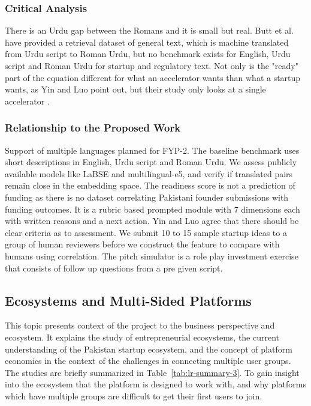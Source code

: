 \documentclass{FastFyp}
\begin{document}
\subsubsection{Critical Analysis}
There is an Urdu gap between the Romans and it is small but real. Butt et al. have provided a retrieval dataset of general text, which is machine translated from Urdu script to Roman Urdu, but no benchmark exists for English, Urdu script and Roman Urdu for startup and regulatory text. Not only is the "ready" part of the equation different for what an accelerator wants than what a startup wants, as Yin and Luo point out, but their study only looks at a single accelerator \cite{ref:yin2018accelerator}.

\subsubsection{Relationship to the Proposed Work}
Support of multiple languages planned for FYP-2. The baseline benchmark uses short descriptions in English, Urdu script and Roman Urdu. We assess publicly available models like LaBSE and multilingual-e5, and verify if translated pairs remain close in the embedding space. The readiness score is not a prediction of funding as there is no dataset correlating Pakistani founder submissions with funding outcomes. It is a rubric based prompted module with 7 dimensions each with written reasons and a next action. Yin and Luo agree that there should be clear criteria as to assessment. We submit 10 to 15 sample startup ideas to a group of human reviewers before we construct the feature to compare with humans using correlation. The pitch simulator is a role play investment exercise that consists of follow up questions from a pre given script.

\subsection{Ecosystems and Multi-Sided Platforms}
This topic presents context of the project to the business perspective and ecosystem. It explains the study of entrepreneurial ecosystems, the current understanding of the Pakistan startup ecosystem, and the concept of platform economics in the context of the challenges in connecting multiple user groups. The studies are briefly summarized in Table~\ref{tab:lr-summary-3}. To gain insight into the ecosystem that the platform is designed to work with, and why platforms which have multiple groups are difficult to get their first users to join.
\end{document}
